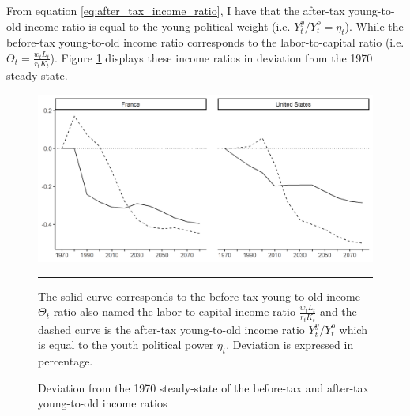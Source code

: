 From equation \eqref{eq:after_tax_income_ratio}, I have that the after-tax young-to-old income ratio is equal to the young political weight (i.e. $Y_t^y/Y_t^o = \eta_t$). While the before-tax young-to-old income ratio corresponds to the labor-to-capital ratio (i.e. $\Theta_t = \frac{w_tL_t}{r_tK_t}$). Figure \ref{fig:raw_vs_net_inc_ratio} displays these income ratios in deviation from the 1970 steady-state.
\begin{figure}[tb]
	\centering
	\includegraphics[width=1\linewidth]{../result/redistribution/dev_incratio_raw_vs_net.png}
	\caption{Deviation from the 1970 steady-state of the before-tax and after-tax young-to-old income ratios}
	\label{fig:raw_vs_net_inc_ratio}
	\vspace{.5ex}
	\hrule
	\vspace{-4ex}
	\justify\singlespacing\footnotesize The solid curve corresponds to the before-tax young-to-old income $\Theta_t$ ratio also named the labor-to-capital income ratio $\frac{w_tL_t}{r_tK_t}$ and the dashed curve is the after-tax young-to-old income ratio $Y_t^y/Y_t^o$ which is equal to the youth political power $\eta_t$. Deviation is expressed in percentage.
\end{figure}
